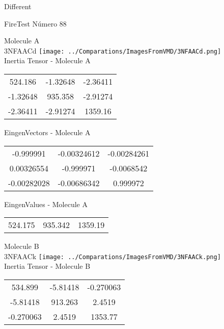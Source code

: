 \begin{center}
\vtab
\vtab
\textcolor{NavyBlue}{\Large Different}
\end{center}

 \newpage

\vtab[-2cm]
\begin{center}
{\large FireTest \tab Número 88}
\end{center}
\begin{multicols}{2}
\begin{center}

Molecule A \\ 
3NFAACd
\texttt{[image: ../Comparations/ImagesFromVMD/3NFAACd.png]}
\\
Inertia Tensor - Molecule A \\
\vtab

\begin{tabular}{|c c c|}
524.186	 & 	-1.32648	 & 	-2.36411	 \\
-1.32648	 & 	935.358	 & 	-2.91274	 \\
-2.36411	 & 	-2.91274	 & 	1359.16
\end{tabular}

\vtab
 EingenVectors - Molecule A     \\
\vtab
\begin{tabular}{|c c c|}
-0.999991	 & 	-0.00324612	 & 	-0.00284261	 \\
0.00326554	 & 	-0.999971	 & 	-0.0068542	 \\
-0.00282028	 & 	-0.00686342	 & 	0.999972
\end{tabular}

\vtab
 EingenValues - Molecule A     \\
\vtab
\begin{tabular}{|c c c|}
524.175	 & 	935.342	 & 	1359.19	 \\
\end{tabular}
\columnbreak

Molecule B \\ 
3NFAACk
\texttt{[image: ../Comparations/ImagesFromVMD/3NFAACk.png]}
\\
Inertia Tensor - Molecule B \\
\vtab

\begin{tabular}{|c c c|}
534.899	 & 	-5.81418	 & 	-0.270063	 \\
-5.81418	 & 	913.263	 & 	2.4519	 \\
-0.270063	 & 	2.4519	 & 	1353.77
\end{tabular}


\end{center}
\end{multicols}
